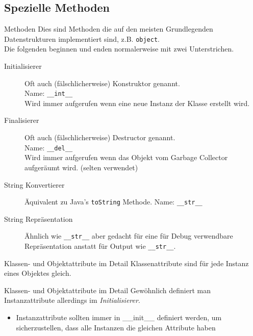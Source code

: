 \subsection{Spezielle Methoden}
\begin{frame}[fragile]{Methoden}
	Dies sind Methoden die auf den meisten Grundlegenden Datenstrukturen implementiert sind, z.B. \texttt{object}.\\
	Die folgenden beginnen und enden normalerweise mit zwei Unterstrichen.

	\begin{description}
		\item[Initialisierer] Oft auch (fälschlicherweise) Konstruktor genannt.\\ Name: \texttt{\_\_int\_\_}\\
			Wird immer aufgerufen wenn eine neue Instanz der Klasse erstellt wird.
		\item[Finalisierer] Oft auch (fälschlicherweise) Destructor genannt.\\
			Name: \texttt{\_\_del\_\_}\\
			Wird immer aufgerufen wenn das Objekt vom Garbage Collector aufgeräumt wird. (selten verwendet)
		\item[String Konvertierer] Äquivalent zu Java's \texttt{toString} Methode. Name: \texttt{\_\_str\_\_}
		\item[String Repräsentation] Ähnlich wie \texttt{\_\_str\_\_} aber gedacht für eine für Debug verwendbare Repräsentation anstatt für Output wie \texttt{\_\_str\_\_}.
	\end{description}
\end{frame}

\begin{frame}[fragile]{Klassen- und Objektattribute im Detail}
	Klassenattribute sind für jede Instanz eines Objektes gleich.
	
\end{frame}

\begin{frame}[fragile]{Klassen- und Objektattribute im Detail}
	Gewöhnlich definiert man Instanzattribute allerdings im \textit{Initialisierer}.
	
	\begin{itemize}
		\item Instanzattribute sollten immer in \_\_init\_\_ definiert werden, um sicherzustellen, dass alle Instanzen die gleichen Attribute haben
	\end{itemize}
\end{frame}




